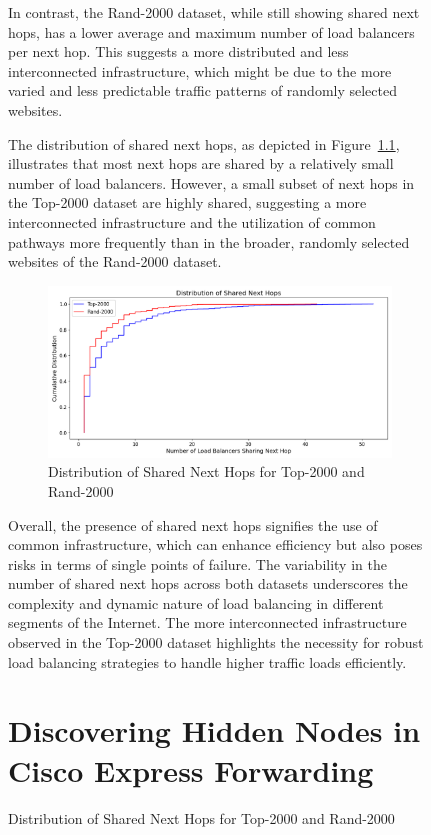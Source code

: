 \documentclass[12pt]{cwru_thesis}
\begin{document}
\begin{figure}[h!]
In contrast, the Rand-2000 dataset, while still showing shared next hops, has a lower average and maximum number of load balancers per next hop. This suggests a more distributed and less interconnected infrastructure, which might be due to the more varied and less predictable traffic patterns of randomly selected websites.


The distribution of shared next hops, as depicted in Figure~\ref{fig:shared_next_hops_combined}, illustrates that most next hops are shared by a relatively small number of load balancers. However, a small subset of next hops in the Top-2000 dataset are highly shared, suggesting a more interconnected infrastructure and the utilization of common pathways more frequently than in the broader, randomly selected websites of the Rand-2000 dataset.

\begin{figure}[h!]
    \centering
    \includegraphics[width=\linewidth]{figures/shared_next_hops_combined.png}
    \caption{Distribution of Shared Next Hops for Top-2000 and Rand-2000}
    \label{fig:shared_next_hops_combined}
\end{figure}

Overall, the presence of shared next hops signifies the use of common infrastructure, which can enhance efficiency but also poses risks in terms of single points of failure. The variability in the number of shared next hops across both datasets underscores the complexity and dynamic nature of load balancing in different segments of the Internet. The more interconnected infrastructure observed in the Top-2000 dataset highlights the necessity for robust load balancing strategies to handle higher traffic loads efficiently.



\chapter{Discovering Hidden Nodes in Cisco Express Forwarding}


\end{figure}
\end{document}
